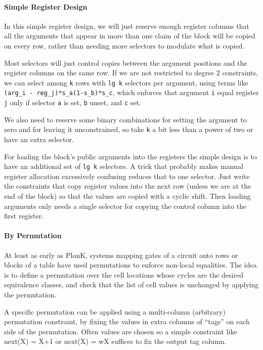 \documentclass{article}
\theoremstyle{plain}
\theoremstyle{definition}
\begin{document}
\paragraph{Simple Register Design\\}\label{simple-register-design}

In this simple register design, we will just reserve enough register
columns that all the arguments that appear in more than one claim of the
block will be copied on every row, rather than needing more selectors to
modulate what is copied.

Most selectors will just control copies between the argument positions
and the register columns on the same row. If we are not restricted to
degree 2 constraints, we can select among \texttt{k} rows with
\texttt{lg\ k} selectors per argument, using terms like
\texttt{(arg\_i\ -\ reg\_j)*s\_a(1-s\_b)*s\_c}, which enforces that
argument \texttt{i} equal register \texttt{j} only if selector
\texttt{a} is set, \texttt{b} unset, and \texttt{c} set.

We also need to reserve some binary combinations for setting the
argument to zero and for leaving it unconstrained, so take \texttt{k} a
bit less than a power of two or have an extra selector.

For loading the block's public arguments into the registers the simple
design is to have an additional set of \texttt{lg\ k} selectors. A trick
that probably makes manual register allocation excessively confusing
reduces that to one selector. Just write the constraints that copy
register values into the next row (unless we are at the end of the
block) so that the values are copied with a cyclic shift. Then loading
arguments only needs a single selector for copying the control column
into the first register.

\paragraph{By Permutation\\}\label{by-permutation}

At least as early as PlonK, systems mapping gates of a circuit onto rows
or blocks of a table have used permutations to enforce non-local
equalities. The idea is to define a permutation over the cell locations
whose cycles are the desired equivalence classes, and check that the
list of cell values is unchanged by applying the permutation.

A specific permutation can be applied using a multi-column (arbitrary)
permutation constraint, by fixing the values in extra columns of
``tags'' on each side of the permutation. Often values are chosen so a
simple constraint like next(X) = X+1 or next(X) = wX suffices to fix the
output tag column.
\end{document}
